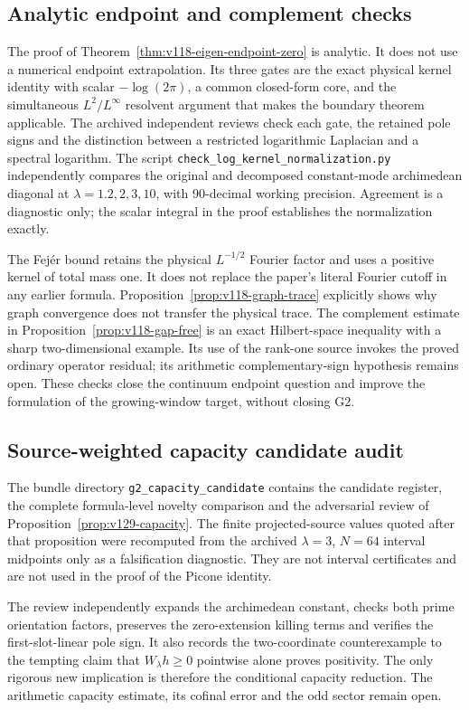 \documentclass[11pt]{article}
\theoremstyle{remark}
\begin{document}
\subsection*{Analytic endpoint and complement checks}
The proof of Theorem~\ref{thm:v118-eigen-endpoint-zero} is analytic.
It does not use a numerical endpoint extrapolation. Its three gates are
the exact physical kernel identity with scalar $-\log(2\pi)$, a common
closed-form core, and the simultaneous $L^2/L^\infty$ resolvent argument
that makes the boundary theorem applicable. The archived independent
reviews check each gate, the retained pole signs and the distinction
between a restricted logarithmic Laplacian and a spectral logarithm.
The script \texttt{check\_log\_kernel\_normalization.py} independently
compares the original and decomposed constant-mode archimedean diagonal
at $\lambda=1.2,2,3,10$, with 90-decimal working precision. Agreement is
a diagnostic only; the scalar integral in the proof establishes the
normalization exactly.

The Fej\'er bound retains the physical $L^{-1/2}$ Fourier factor and
uses a positive kernel of total mass one. It does not replace the
paper's literal Fourier cutoff in any earlier formula.
Proposition~\ref{prop:v118-graph-trace} explicitly shows why graph
convergence does not transfer the physical trace.
The complement estimate in Proposition~\ref{prop:v118-gap-free}
is an exact Hilbert-space inequality with a sharp two-dimensional
example. Its use of the rank-one source invokes the proved ordinary
operator residual; its arithmetic complementary-sign hypothesis remains
open. These checks close the continuum endpoint question and improve
the formulation of the growing-window target, without closing G2.

\subsection*{Source-weighted capacity candidate audit}
The bundle directory \texttt{g2\_capacity\_candidate} contains the
candidate register, the complete formula-level novelty comparison and
the adversarial review of Proposition~\ref{prop:v129-capacity}. The
finite projected-source values quoted after that proposition were
recomputed from the archived $\lambda=3$, $N=64$ interval midpoints
only as a falsification diagnostic. They are not interval certificates
and are not used in the proof of the Picone identity.

The review independently expands the archimedean constant, checks both
prime orientation factors, preserves the zero-extension killing terms
and verifies the first-slot-linear pole sign. It also records the
two-coordinate counterexample to the tempting claim that
$W_\lambda h\ge0$ pointwise alone proves positivity. The only rigorous
new implication is therefore the conditional capacity reduction.
The arithmetic capacity estimate, its cofinal error and the odd sector
remain open.
\end{document}

